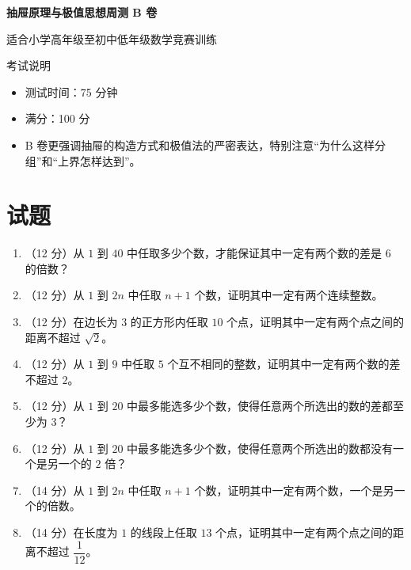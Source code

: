 \documentclass[11pt,a4paper,fontset=fandol]{ctexart}
\newcommand{\answerspace}{\vspace{2.3cm}}
\newcommand{\biganswerspace}{\vspace{3.2cm}}
\begin{document}
\thispagestyle{empty}
\begin{center}
{\fontsize{22}{28}\selectfont\bfseries 抽屉原理与极值思想周测 B 卷\par}
\vspace{0.4cm}
{\large 适合小学高年级至初中低年级数学竞赛训练\par}
\end{center}

\begin{infobox}{考试说明}
\begin{itemize}
  \item 测试时间：75 分钟
  \item 满分：100 分
  \item B 卷更强调抽屉的构造方式和极值法的严密表达，特别注意“为什么这样分组”和“上界怎样达到”。
\end{itemize}
\end{infobox}

\section{试题}

\begin{enumerate}
  \item （12 分）从 $1$ 到 $40$ 中任取多少个数，才能保证其中一定有两个数的差是 $6$ 的倍数？
  \answerspace

  \item （12 分）从 $1$ 到 $2n$ 中任取 $n+1$ 个数，证明其中一定有两个连续整数。
  \answerspace

  \item （12 分）在边长为 $3$ 的正方形内任取 $10$ 个点，证明其中一定有两个点之间的距离不超过 $\sqrt{2}$。
  \biganswerspace

  \item （12 分）从 $1$ 到 $9$ 中任取 $5$ 个互不相同的整数，证明其中一定有两个数的差不超过 $2$。
  \answerspace

  \item （12 分）从 $1$ 到 $20$ 中最多能选多少个数，使得任意两个所选出的数的差都至少为 $3$？
  \biganswerspace

  \item （12 分）从 $1$ 到 $20$ 中最多能选多少个数，使得任意两个所选出的数都没有一个是另一个的 $2$ 倍？
  \biganswerspace

  \item （14 分）从 $1$ 到 $2n$ 中任取 $n+1$ 个数，证明其中一定有两个数，一个是另一个的倍数。
  \biganswerspace

  \item （14 分）在长度为 $1$ 的线段上任取 $13$ 个点，证明其中一定有两个点之间的距离不超过 $\dfrac{1}{12}$。
  \biganswerspace
\end{enumerate}
\end{document}
